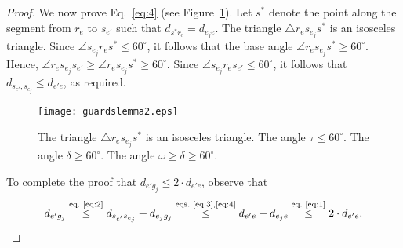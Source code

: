 \documentclass[11pt]{article}
\newenvironment{proof sketch}{\noindent {\bf Proof sketch:} }{\hfill \qed}
\begin{document}
\begin{proof}
We now prove Eq.~\ref{eq:4} (see Figure~\ref{fig:guards2}).  Let $s^*$ denote the point along the
segment from $r_e$ to $s_{e'}$ such that $d_{s^*r_e}=d_{e_je}$.  The
triangle $\triangle r_es_{e_j}s^*$ is an isosceles triangle.  Since
$\angle s_{e_j} r_e s^* \leq 60^\circ$, it follows that the base
angle $\angle r_e s_{e_j} s^* \geq
60^\circ$.  Hence, $\angle r_e s_{e_j} s_{e'} \geq \angle r_e s_{e_j} s^* \geq  60^\circ$.  Since $\angle s_{e_j} r_e s_{e'} \leq 60^\circ$,
it follows that $d_{s_{e'},s_{e_j}} \leq d_{e'e}$, as required.

\begin{figure}[H]
  \centering
    \texttt{[image: guardslemma2.eps]}
    \caption{ The
triangle $\triangle r_es_{e_j}s^*$ is an isosceles triangle. The angle $\tau \leq  60^\circ$. The angle $\delta \geq  60^\circ$. The angle $\omega \geq \delta \geq  60^\circ$.}
  \label{fig:guards2}
\end{figure}

To complete the proof that $d_{e'g_j} \leq 2\cdot d_{e'e}$, observe that
\begin{align*}
  d_{e'g_j} \stackrel{\text{eq.~\ref{eq:2}}}{\leq} d_{s_{e'}s_{e_j}}+ d_{e_jg_j}
\stackrel{\text{eqs.~\ref{eq:3},\ref{eq:4}}}{\leq} d_{e'e} + d_{e_je}
\stackrel{\text{eq.~\ref{eq:1}}}{\leq} 2\cdot d_{e'e}.
\end{align*}
\end{proof}
\end{document}
